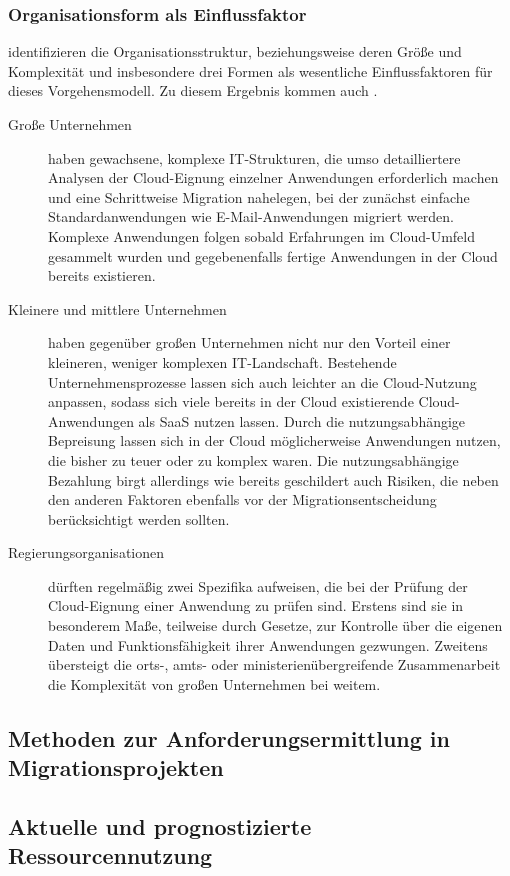 \subsubsection{Organisationsform als Einflussfaktor}
 identifizieren die Organisationsstruktur, beziehungsweise 
deren Größe und Komplexität und insbesondere drei Formen als 
wesentliche Einflussfaktoren für dieses Vorgehensmodell. Zu diesem Ergebnis 
kommen auch .
\begin{description}
	\item[Große Unternehmen] haben gewachsene, komplexe IT-Strukturen, die 
umso detailliertere Analysen der Cloud-Eignung einzelner Anwendungen 
erforderlich machen und eine Schrittweise Migration nahelegen, bei der 
zunächst einfache Standardanwendungen wie E-Mail-Anwendungen migriert werden. 
Komplexe Anwendungen folgen sobald Erfahrungen im Cloud-Umfeld gesammelt wurden 
und gegebenenfalls fertige Anwendungen in der Cloud bereits existieren.
	\item[Kleinere und mittlere Unternehmen] haben gegenüber großen 
Unternehmen nicht nur den Vorteil einer kleineren, weniger komplexen 
IT-Landschaft. Bestehende Unternehmensprozesse lassen sich auch leichter an die 
Cloud-Nutzung anpassen, sodass sich viele bereits in der Cloud existierende 
Cloud-Anwendungen als SaaS nutzen lassen. Durch die nutzungsabhängige 
Bepreisung lassen sich in der Cloud möglicherweise Anwendungen nutzen, die 
bisher zu teuer oder zu komplex waren. Die nutzungsabhängige Bezahlung birgt 
allerdings wie bereits geschildert auch Risiken, die neben den anderen Faktoren 
ebenfalls vor der Migrationsentscheidung berücksichtigt werden sollten.
	\item[Regierungsorganisationen] dürften regelmäßig zwei Spezifika 
aufweisen, die bei der Prüfung der Cloud-Eignung einer Anwendung zu prüfen 
sind. Erstens sind sie in besonderem Maße, teilweise durch Gesetze, zur 
Kontrolle über die eigenen Daten und Funktionsfähigkeit ihrer Anwendungen 
gezwungen. Zweitens übersteigt die orts-, amts- oder ministerienübergreifende 
Zusammenarbeit die Komplexität von großen Unternehmen bei weitem. 
\end{description}



\subsection{Methoden zur Anforderungsermittlung in Migrationsprojekten}
\subsection{Aktuelle und prognostizierte Ressourcennutzung}
